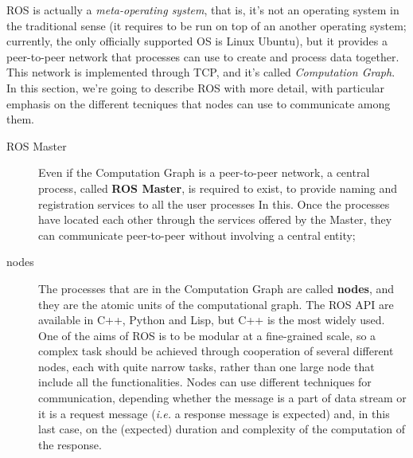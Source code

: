 \ac{ROS} is actually a \textit{meta-operating system}, that is, it's not an operating system in the traditional sense (it requires to be run on top of an another operating system; currently, the only officially supported OS is Linux Ubuntu), but it provides a peer-to-peer network that processes can use to create and process data together. This network is implemented through TCP, and it's called \textit{Computation Graph}. In this section, we're going to describe \ac{ROS} with more detail, with particular emphasis on the different tecniques that nodes can use to communicate among them.
\begin{description}
\item[ROS Master] Even if the Computation Graph is a peer-to-peer network, a central process, called  \textbf{\ac{ROS} Master}, is required to exist, to provide naming and registration services to all the user processes In this. Once the processes have located each other through the services offered by the Master, they can communicate peer-to-peer without involving a central entity;

\item[nodes] The processes that are in the Computation Graph are called \textbf{nodes}, and they are the atomic units of the computational graph. The \ac{ROS} API are available in C++, Python and Lisp, but C++ is the most widely used. One of the aims of \ac{ROS} is to be modular at a fine-grained scale, so a complex task should be achieved through cooperation of several different nodes, each with quite narrow tasks, rather than one large node that include all the functionalities. Nodes can use different techniques for communication, depending whether the message is a part of data stream or it is a request message (\textit{i.e.} a response message is expected) and, in this last case, on the (expected) duration and complexity of the computation of the response.


\end{description}
